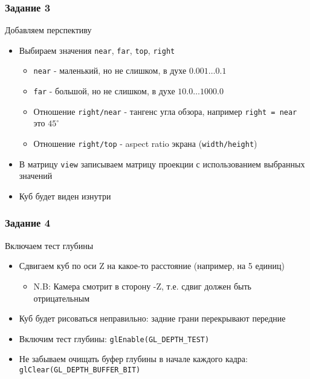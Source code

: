\documentclass{beamer}
\begin{document}
\begin{frame}[fragile]
\frametitle{Задание 3}
Добавляем перспективу
\begin{itemize}
\item Выбираем значения \verb|near|, \verb|far|, \verb|top|, \verb|right|
\begin{itemize}
\item \verb|near| - маленький, но не слишком, в духе \begin{math}0.001 \dots 0.1\end{math}
\item \verb|far| - большой, но не слишком, в духе \begin{math}10.0 \dots 1000.0\end{math}
\item Отношение \verb|right/near| - тангенс угла обзора, например \verb|right = near| это \begin{math}45^\circ\end{math}
\item Отношение \verb|right/top| - aspect ratio экрана (\verb|width/height|)
\end{itemize}
\pause
\item В матрицу \verb|view| записываем матрицу проекции с использованием выбранных значений
\pause
\item Куб будет виден изнутри
\end{itemize}
\end{frame}

\begin{frame}[fragile]
\frametitle{Задание 4}
Включаем тест глубины
\begin{itemize}
\item Сдвигаем куб по оси Z на какое-то расстояние (например, на 5 единиц)
\begin{itemize}
\item N.B: Камера смотрит в сторону -Z, т.е. сдвиг должен быть отрицательным
\end{itemize}
\pause
\item Куб будет рисоваться неправильно: задние грани перекрывают передние
\pause
\item Включим тест глубины: \verb|glEnable(GL_DEPTH_TEST)|
\pause
\item Не забываем очищать буфер глубины в начале каждого кадра: \verb|glClear(GL_DEPTH_BUFFER_BIT)|
\end{itemize}
\end{frame}
\end{document}
